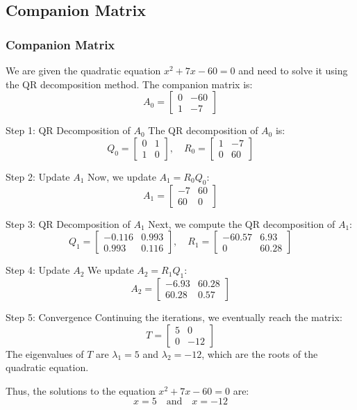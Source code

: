\documentclass{beamer}
\theoremstyle{remark}
\numberwithin{equation}{section}
\begin{document}
	
	\subsection{Companion Matrix}
	\begin{frame}[allowframebreaks]
		\frametitle{Companion Matrix}
		
		We are given the quadratic equation \(x^2 + 7x - 60 = 0\) and need to solve it using the QR decomposition method. The companion matrix is:
		\[
		A_0 = \begin{bmatrix} 0 & -60 \\ 1 & -7 \end{bmatrix}
		\]
		
		Step 1: QR Decomposition of \(A_0\)
		The QR decomposition of \(A_0\) is:
		\[
		Q_0 = \begin{bmatrix} 0 & 1 \\ 1 & 0 \end{bmatrix}, \quad
		R_0 = \begin{bmatrix} 1 & -7 \\ 0 & 60 \end{bmatrix}
		\]
		
		Step 2: Update \(A_1\)
		Now, we update \(A_1 = R_0 Q_0\):
		\[
		A_1 = \begin{bmatrix} -7 & 60 \\ 60 & 0 \end{bmatrix}
		\]
		
		Step 3: QR Decomposition of \(A_1\)
		Next, we compute the QR decomposition of \(A_1\):
		\[
		Q_1 = \begin{bmatrix} -0.116 & 0.993 \\ 0.993 & 0.116 \end{bmatrix}, \quad
		R_1 = \begin{bmatrix} -60.57 & 6.93 \\ 0 & 60.28 \end{bmatrix}
		\]
		
		Step 4: Update \(A_2\)
		We update \(A_2 = R_1 Q_1\):
		\[
		A_2 = \begin{bmatrix} -6.93 & 60.28 \\ 60.28 & 0.57 \end{bmatrix}
		\]
		
		Step 5: Convergence
		Continuing the iterations, we eventually reach the matrix:
		\[
		T = \begin{bmatrix} 5 & 0 \\ 0 & -12 \end{bmatrix}
		\]
		The eigenvalues of \(T\) are \( \lambda_1 = 5 \) and \( \lambda_2 = -12 \), which are the roots of the quadratic equation.
		
		Thus, the solutions to the equation \(x^2 + 7x - 60 = 0\) are:
		\[
		x = 5 \quad \text{and} \quad x = -12
		\]
		
	\end{frame}
\end{document}

